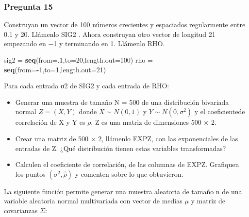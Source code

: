\documentclass[]{article}
\newenvironment{Shaded}{\begin{snugshade}}{\end{snugshade}}
\newcommand{\DataTypeTok}[1]{\textcolor[rgb]{0.13,0.29,0.53}{#1}}
\newcommand{\DecValTok}[1]{\textcolor[rgb]{0.00,0.00,0.81}{#1}}
\newcommand{\KeywordTok}[1]{\textcolor[rgb]{0.13,0.29,0.53}{\textbf{#1}}}
\newcommand{\NormalTok}[1]{#1}
\newcommand{\OperatorTok}[1]{\textcolor[rgb]{0.81,0.36,0.00}{\textbf{#1}}}
\newcommand{\StringTok}[1]{\textcolor[rgb]{0.31,0.60,0.02}{#1}}
\providecommand{\tightlist}{%
  \setlength{\itemsep}{0pt}\setlength{\parskip}{0pt}}
\begin{document}
\hypertarget{pregunta-15}{%
\subsubsection{Pregunta 15}\label{pregunta-15}}

Construyan un vector de 100 números crecientes y espaciados regularmente
entre 0.1 y 20. Llámenlo SIG2 . Ahora construyan otro vector de longitud
21 empezando en −1 y terminando en 1. Llámenlo RHO.

\begin{Shaded}
\begin{Highlighting}[]
\NormalTok{sig2 =}\StringTok{ }\KeywordTok{seq}\NormalTok{(}\DataTypeTok{from=}\NormalTok{.}\DecValTok{1}\NormalTok{,}\DataTypeTok{to=}\DecValTok{20}\NormalTok{,}\DataTypeTok{length.out=}\DecValTok{100}\NormalTok{)}
\NormalTok{rho =}\StringTok{ }\KeywordTok{seq}\NormalTok{(}\DataTypeTok{from=}\OperatorTok{-}\DecValTok{1}\NormalTok{,}\DataTypeTok{to=}\DecValTok{1}\NormalTok{,}\DataTypeTok{length.out=}\DecValTok{21}\NormalTok{)}
\end{Highlighting}
\end{Shaded}

Para cada entrada σ2 de SIG2 y cada entrada de RHO:

\begin{itemize}
\tightlist
\item
  Generar una muestra de tamaño N = 500 de una distribución bivariada
  normal \(Z =(X,Y)\) donde \(X \sim N(0,1)\) y \(Y \sim N(0,\sigma^2)\)
  y el coeficientede correlación de X y Y es \(\rho\). Z es una matriz
  de dimensiones 500 × 2.
\item
  Crear una matriz de 500 × 2, llámenlo EXPZ, con las exponenciales de
  las entradas de Z. ¿Qué distribución tienen estas variables
  transformadas?
\item
  Calculen el coeficiente de correlación,  de las columnas de
  EXPZ. Grafiquen los puntos \((\sigma^2, \hat{ρ})\) y comenten sobre lo
  que obtuvieron.
\end{itemize}

La siguiente función permite generar una muestra aleatoria de tamaño n
de una variable aleatoria normal multivariada con vector de medias
\(\mu\) y matriz de covarianzas \(\Sigma\):
\end{document}
